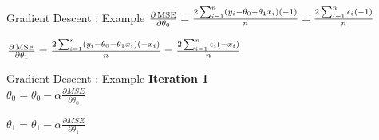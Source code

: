 \documentclass[usenames,dvipsnames]{beamer}
\begin{document}
        \begin{frame}{Gradient Descent : Example}
            $\frac{\partial \operatorname{MSE}}{\partial \theta_0} = \frac{2\sum_{i=1}^n \left( y_i - \theta_0 -\theta_1x_i \right)\left(-1\right)}{n} = \frac{2\sum_{i=1}^n \epsilon_i\left(-1\right)}{n}$  
            
            \vspace{2cm}
            $\frac{\partial \operatorname{MSE}}{\partial \theta_1} = \frac{2\sum_{i=1}^n \left( y_i - \theta_0 -\theta_1x_i \right)\left(-x_i\right)}{n} = \frac{2\sum_{i=1}^n \epsilon_i\left(-x_i\right)}{n}$ 
            \end{frame}
            
            \begin{frame}{Gradient Descent : Example}
            \textbf{Iteration 1}\\
            \vspace{0.5cm}
            $\theta_0 = \theta_0 - \alpha\frac{\partial MSE}{\partial \theta_0}$\\ 
            \vspace{0.5cm}
            
            $\theta_1 = \theta_1 - \alpha\frac{\partial MSE}{\partial \theta_1}$\\ 
            \vspace{0.5cm}
            \end{frame}
\end{document}
